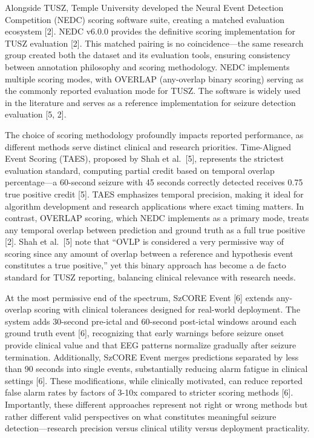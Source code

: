 Alongside TUSZ, Temple University developed the Neural Event Detection
Competition (NEDC) scoring software suite, creating a matched evaluation
ecosystem {[}2{]}. NEDC v6.0.0 provides the definitive scoring
implementation for TUSZ evaluation {[}2{]}. This matched pairing is no
coincidence---the same research group created both the dataset and its
evaluation tools, ensuring consistency between annotation philosophy and
scoring methodology. NEDC implements multiple scoring modes, with
OVERLAP (any-overlap binary scoring) serving as the commonly reported
evaluation mode for TUSZ. The software is widely used in the literature
and serves as a reference implementation for seizure detection
evaluation {[}5, 2{]}.

The choice of scoring methodology profoundly impacts reported
performance, as different methods serve distinct clinical and research
priorities. Time-Aligned Event Scoring (TAES), proposed by Shah et
al.~{[}5{]}, represents the strictest evaluation standard, computing
partial credit based on temporal overlap percentage---a 60-second
seizure with 45 seconds correctly detected receives 0.75 true positive
credit {[}5{]}. TAES emphasizes temporal precision, making it ideal for
algorithm development and research applications where exact timing
matters. In contrast, OVERLAP scoring, which NEDC implements as a
primary mode, treats any temporal overlap between prediction and ground
truth as a full true positive {[}2{]}. Shah et al.~{[}5{]} note that
``OVLP is considered a very permissive way of scoring since any amount
of overlap between a reference and hypothesis event constitutes a true
positive,'' yet this binary approach has become a de facto standard for
TUSZ reporting, balancing clinical relevance with research needs.

At the most permissive end of the spectrum, SzCORE Event {[}6{]} extends
any-overlap scoring with clinical tolerances designed for real-world
deployment. The system adds 30-second pre-ictal and 60-second post-ictal
windows around each ground truth event {[}6{]}, recognizing that early
warnings before seizure onset provide clinical value and that EEG
patterns normalize gradually after seizure termination. Additionally,
SzCORE Event merges predictions separated by less than 90 seconds into
single events, substantially reducing alarm fatigue in clinical settings
{[}6{]}. These modifications, while clinically motivated, can reduce
reported false alarm rates by factors of 3-10x compared to stricter
scoring methods {[}6{]}. Importantly, these different approaches
represent not right or wrong methods but rather different valid
perspectives on what constitutes meaningful seizure detection---research
precision versus clinical utility versus deployment practicality.

